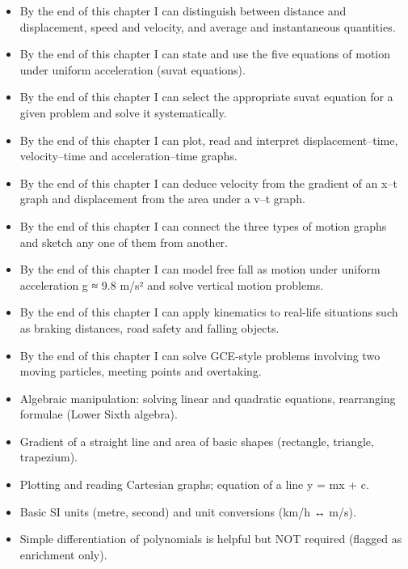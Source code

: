 \documentclass[11pt]{article}
\begin{document}
\begin{objectifs}
\begin{itemize}
\item By the end of this chapter I can distinguish between distance and displacement, speed and velocity, and average and instantaneous quantities.
\item By the end of this chapter I can state and use the five equations of motion under uniform acceleration (suvat equations).
\item By the end of this chapter I can select the appropriate suvat equation for a given problem and solve it systematically.
\item By the end of this chapter I can plot, read and interpret displacement–time, velocity–time and acceleration–time graphs.
\item By the end of this chapter I can deduce velocity from the gradient of an x–t graph and displacement from the area under a v–t graph.
\item By the end of this chapter I can connect the three types of motion graphs and sketch any one of them from another.
\item By the end of this chapter I can model free fall as motion under uniform acceleration g ≈ 9.8 m/s² and solve vertical motion problems.
\item By the end of this chapter I can apply kinematics to real-life situations such as braking distances, road safety and falling objects.
\item By the end of this chapter I can solve GCE-style problems involving two moving particles, meeting points and overtaking.
\end{itemize}
\end{objectifs}

\begin{prerequis}
\begin{itemize}
\item Algebraic manipulation: solving linear and quadratic equations, rearranging formulae (Lower Sixth algebra).
\item Gradient of a straight line and area of basic shapes (rectangle, triangle, trapezium).
\item Plotting and reading Cartesian graphs; equation of a line y = mx + c.
\item Basic SI units (metre, second) and unit conversions (km/h ↔ m/s).
\item Simple differentiation of polynomials is helpful but NOT required (flagged as enrichment only).
\end{itemize}
\end{prerequis}
\end{document}
